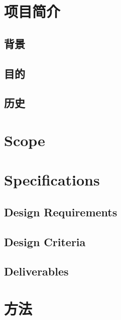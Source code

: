 




% 

\begin{spacing}{1.5}
\songti{}
\setcounter{page}{1}
    \section{项目简介}
    \subsection{背景}
    \subsection{目的}
    \subsection{历史}
    \section{Scope}
    \section{Specifications}
    \subsection{Design Requirements}
    \subsection{Design Criteria}
    \subsection{Deliverables}
    \section{方法}

\end{spacing}


